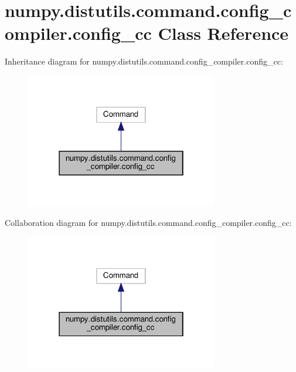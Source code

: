 \hypertarget{classnumpy_1_1distutils_1_1command_1_1config__compiler_1_1config__cc}{}\section{numpy.\+distutils.\+command.\+config\+\_\+compiler.\+config\+\_\+cc Class Reference}
\label{classnumpy_1_1distutils_1_1command_1_1config__compiler_1_1config__cc}


Inheritance diagram for numpy.\+distutils.\+command.\+config\+\_\+compiler.\+config\+\_\+cc\+:
\nopagebreak
\begin{figure}[H]
\begin{center}
\leavevmode
\includegraphics[width=238pt]{classnumpy_1_1distutils_1_1command_1_1config__compiler_1_1config__cc__inherit__graph}
\end{center}
\end{figure}


Collaboration diagram for numpy.\+distutils.\+command.\+config\+\_\+compiler.\+config\+\_\+cc\+:
\nopagebreak
\begin{figure}[H]
\begin{center}
\leavevmode
\includegraphics[width=238pt]{classnumpy_1_1distutils_1_1command_1_1config__compiler_1_1config__cc__coll__graph}
\end{center}
\end{figure}
